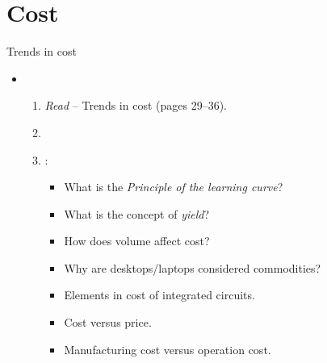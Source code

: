 \section{Cost}

\begin{frame}[t]{Trends in cost}
\begin{itemize}
  \item {}
    \begin{enumerate}
      \item \emph{Read}  -- Trends in cost (pages 29--36).
        \item \bibhennessy

      \item {}:
        \begin{itemize}
          \item What is the \emph{Principle of the learning curve}?
          \item What is the concept of \emph{yield}?
          \item How does volume affect cost?
          \item Why are desktops/laptops considered commodities?
          \item Elements in cost of integrated circuits.
          \item Cost versus price.
          \item Manufacturing cost versus operation cost.
        \end{itemize}
    \end{enumerate}
\end{itemize}
\end{frame}
